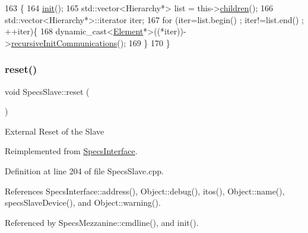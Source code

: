 \begin{DoxyCode}
163                                             \{
164   \hyperlink{classSpecsSlave_ab34b5117373a334027d3a5cf33287bb6}{init}();
165   std::vector<Hierarchy*> list = this->\hyperlink{classHierarchy_aa9a76f69e98e052ee1a6e32cea006288}{children}();
166   std::vector<Hierarchy*>::iterator iter;
167   \textcolor{keywordflow}{for} (iter=list.begin() ; iter!=list.end() ; ++iter)\{
168     \textcolor{keyword}{dynamic\_cast<}\hyperlink{classElement}{Element}*\textcolor{keyword}{>}((*iter))->\hyperlink{classSpecsSlave_a347b94c2ba660ccde6927fe72590a1bc}{recursiveInitCommunications}();
169   \}
170 \}
\end{DoxyCode}
\mbox{\label{classSpecsSlave_a6c69baff5941cabed2947f547041bbeb}} 
\subsubsection{\texorpdfstring{reset()}{reset()}}
{\footnotesize\ttfamily void Specs\+Slave\+::reset (\begin{DoxyParamCaption}{ }\end{DoxyParamCaption})\hspace{0.3cm}{\ttfamily [virtual]}}

External Reset of the Slave 

Reimplemented from \hyperlink{classSpecsInterface_ade474eeef32f10c72926c9ba7d23f9a8}{Specs\+Interface}.



Definition at line 204 of file Specs\+Slave.\+cpp.



References Specs\+Interface\+::address(), Object\+::debug(), itos(), Object\+::name(), specs\+Slave\+Device(), and Object\+::warning().



Referenced by Specs\+Mezzanine\+::cmdline(), and init().


